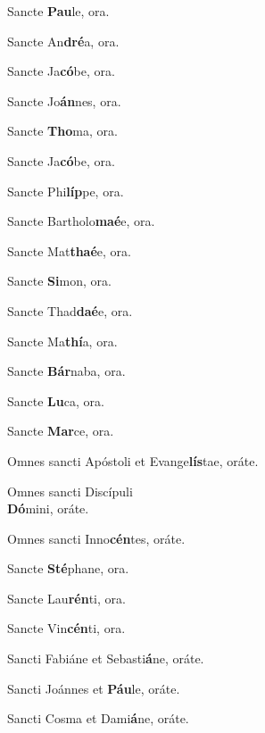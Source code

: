 \vskip-10pt

\begin{multicols}{2}
\begin{hangparas}{1em}{1}
\parskip0mm
\raggedright
Sancte \textbf{Pau}le,
\hfill \mbox{ora.}

Sancte An\textbf{dré}a,
\hfill \mbox{ora.}

Sancte Ja\textbf{có}be,
\hfill \mbox{ora.}

Sancte Jo\textbf{án}nes,
\hfill \mbox{ora.}

Sancte \textbf{Tho}ma,
\hfill \mbox{ora.}

Sancte Ja\textbf{có}be,
\hfill \mbox{ora.}

Sancte Phi\textbf{líp}pe,
\hfill \mbox{ora.}

Sancte Bartholo\textbf{maé}e,
\hfill \mbox{ora.}

Sancte Mat\textbf{thaé}e,
\hfill \mbox{ora.}

Sancte \textbf{Si}mon,
\hfill \mbox{ora.}

Sancte Thad\textbf{daé}e,
\hfill \mbox{ora.}

Sancte Ma\textbf{thí}a,
\hfill \mbox{ora.}

Sancte \textbf{Bár}naba,
\hfill \mbox{ora.}

Sancte \textbf{Lu}ca,
\hfill \mbox{ora.}

Sancte \textbf{Mar}ce,
\hfill \mbox{ora.}

Omnes sancti Apóstoli et Evange\textbf{lís}tae,
\hfill \mbox{oráte.}

Omnes sancti Discípuli\\
\quad \textbf{Dó}mini, \hfill \mbox{oráte.}

Omnes sancti Inno\textbf{cén}tes,
\hfill \mbox{oráte.}

Sancte \textbf{Sté}phane,
\hfill \mbox{ora.}

Sancte Lau\textbf{rén}ti,
\hfill \mbox{ora.}

Sancte Vin\textbf{cén}ti,
\hfill \mbox{ora.}

Sancti Fabiáne et Sebasti\textbf{á}ne,
\hfill \mbox{oráte.}

Sancti Joánnes et \textbf{Páu}le,
\hfill \mbox{oráte.}

Sancti Cosma et Dami\textbf{á}ne,
\hfill \mbox{oráte.}


\end{hangparas}
\end{multicols}

